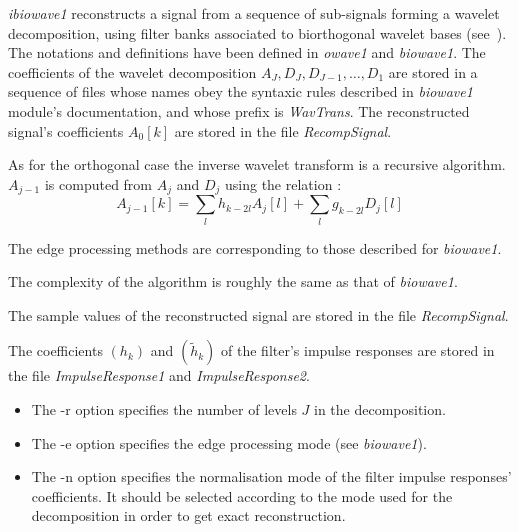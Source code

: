 {\em ibiowave1} reconstructs a signal from a sequence of sub-signals forming a wavelet decomposition, using filter banks associated to biorthogonal wavelet bases (see~\cite{cohen.daubechies.ea:biorthogonal}). 
The notations and definitions have been defined in {\em owave1} and {\em biowave1}. The coefficients of the wavelet decomposition \( A_{J}, D_{J}, D_{J-1}, \ldots, D_{1} \) are stored in a sequence of files whose names obey the syntaxic rules described in {\em biowave1} module's documentation, and whose prefix is {\em WavTrans}. The reconstructed signal's coefficients $A_{0}[k]$ are stored in the file {\em RecompSignal}.

As for the orthogonal case the inverse wavelet transform is a recursive algorithm.  \( A_{j-1} \) is computed from \( A_{j} \) and \( D_{j} \) using the relation :
\[
A_{j-1}[k] = \sum_{l} h_{k-2l} A_{j}[l] + \sum_{l} g_{k-2l} D_{j}[l]
\]

The edge processing methods are corresponding to those described for {\em biowave1}.

The complexity of the algorithm is roughly the same as that of {\em biowave1}.

The sample values of the reconstructed signal are stored in the file {\em RecompSignal}. 

The coefficients $(h_{k})$ and $(\tilde{h}_{k})$ of the filter's impulse responses are stored in the file {\em ImpulseResponse1} and {\em ImpulseResponse2}.

\begin{itemize}
\item
The -r option specifies the number of levels $J$ in the decomposition.
\item
The -e option specifies the edge processing mode (see {\em biowave1}).
\item
The -n option specifies the normalisation mode of the filter impulse responses' coefficients. It should be selected according to the mode used for the decomposition in order to get exact reconstruction. 
\end{itemize}
